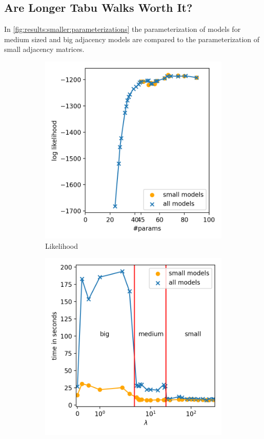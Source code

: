 \documentclass[sigconf, fleqn, prologue, dvipsnames]{acmart}
\begin{document}
\subsection{Are Longer Tabu Walks Worth It?}
In \autoref{fig:results:smaller:parameterizations} the parameterization of models for medium sized and big adjacency models are compared to the parameterization of small adjacency matrices.

\begin{figure}
	\centering
	\begin{subfigure}{0.2\textwidth}
		\centering
		\includegraphics[scale=0.35]{graphics/both_likelihoods.png}
		\caption{Likelihood}
		\label{fig:results:smaller:likelihood}
	\end{subfigure}
	\begin{subfigure}{0.2\textwidth}
		\centering
		\includegraphics[scale=0.35]{graphics/both_times.png}

\end{subfigure}
\end{figure}
\end{document}
